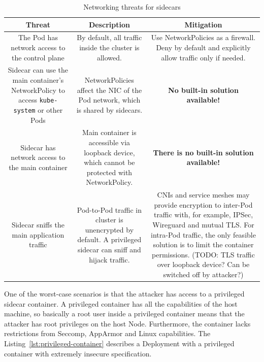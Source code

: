 \documentclass[english, 12pt, a4paper, sci, utf8, a-2b, online]{aaltothesis}
\begin{document}
\begin{table}[H]
  \sffamily
  \centering

  \caption{Networking threats for sidecars}
  \label{table:threat-model-network}

  \begin{minipage}{\textwidth}
  \renewcommand{\thempfootnote}{\arabic{mpfootnote}}
  \begin{tabularx}{\textwidth}{CCC}
    \hline
    \textbf{Threat} & \textbf{Description} & \textbf{Mitigation} \\ \hline
    The Pod has network access to the control plane & By default, all traffic inside the cluster is allowed. & Use NetworkPolicies as a firewall. Deny by default and explicitly allow traffic only if needed. \\ \hline
    Sidecar can use the main container's NetworkPolicy to access \texttt{kube-system} or other Pods & NetworkPolicies affect the NIC of the Pod network, which is shared by sidecars. & \textbf{No built-in solution available!} \\ \hline
    Sidecar has network access to the main container & Main container is accessible via loopback device, which cannot be protected with NetworkPolicy. & \textbf{There is no built-in solution available!} \\ \hline
    Sidecar sniffs the main application traffic & Pod-to-Pod traffic in cluster is unencrypted by default. A privileged sidecar can sniff and hijack traffic. & CNIs and service meshes may provide encryption to inter-Pod traffic with, for example, IPSec, Wireguard and mutual TLS. For intra-Pod traffic, the only feasible solution is to limit the container permissions. (TODO: TLS traffic over loopback device? Can be switched off by attacker?) \\ \hline
  \end{tabularx}
\end{minipage}
\end{table}

One of the worst-case scenarios is that the attacker has access to a privileged sidecar container.
A privileged container has all the capabilities of the host machine, so basically a root user inside a privileged container means that the attacker has root privileges on the host Node.
Furthermore, the container lacks restrictions from Seccomp, AppArmor and Linux capabilities.
The Listing~\ref{lst:privileged-container} describes a Deployment with a privileged container with extremely insecure specification.
\end{document}
